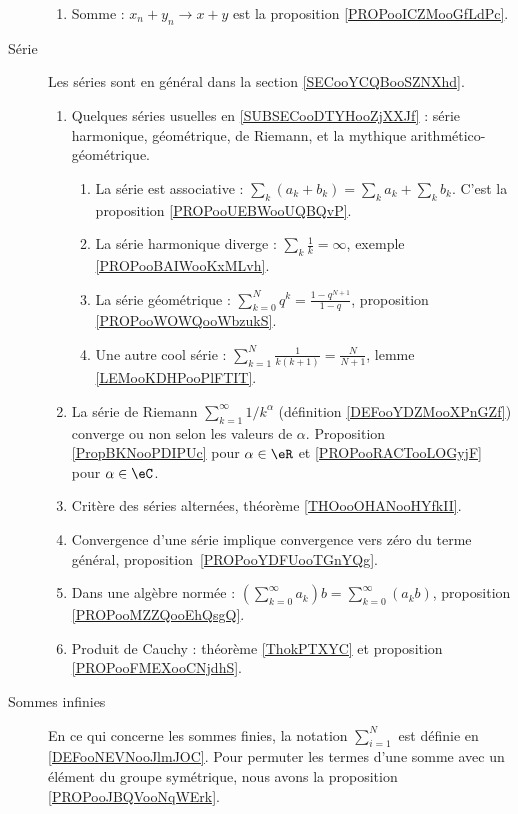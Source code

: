 \begin{description}
\begin{enumerate}
			\item
			      Somme : \( x_n+y_n\to x+y\) est la proposition \ref{PROPooICZMooGfLdPc}.
		\end{enumerate}
	\item[Série]
		Les séries sont en général dans la section \ref{SECooYCQBooSZNXhd}.
		\begin{enumerate}
			\item
			      Quelques séries usuelles en \ref{SUBSECooDTYHooZjXXJf} : série harmonique, géométrique, de Riemann, et la mythique arithmético-géométrique.
			      \begin{enumerate}
				      \item
				            La série est associative : \( \sum_k(a_k+b_k)=\sum_ka_k+\sum_kb_k\). C'est la proposition \ref{PROPooUEBWooUQBQvP}.
				      \item
				            La série harmonique diverge : \( \sum_k\frac{1}{ k }=\infty\), exemple \ref{PROPooBAIWooKxMLvh}.
				      \item
				            La série géométrique : \( \sum_{k=0}^Nq^k=\frac{ 1-q^{N+1} }{ 1-q }\), proposition \ref{PROPooWOWQooWbzukS}.
				      \item
				            Une autre cool série : \( \sum_{k=1}^N\frac{ 1 }{ k(k+1) }=\frac{ N }{ N+1 }\), lemme \ref{LEMooKDHPooPlFTIT}.
			      \end{enumerate}
			\item
			      La série de Riemann \( \sum_{k=1}^{\infty}1/k^{\alpha}\) (définition \ref{DEFooYDZMooXPnGZf}) converge ou non selon les valeurs de \( \alpha\). Proposition \ref{PropBKNooPDIPUc} pour \( \alpha\in \eR\) et \ref{PROPooRACTooLOGyjF} pour \( \alpha\in \eC\).
			\item
			      Critère des séries alternées, théorème \ref{THOooOHANooHYfkII}.
			\item
			      Convergence d'une série implique convergence vers zéro du terme général, proposition~\ref{PROPooYDFUooTGnYQg}.
			\item
			      Dans une algèbre normée : \( (\sum_{k=0}^{\infty}a_k)b=\sum_{k=0}^{\infty}(a_kb)\), proposition \ref{PROPooMZZQooEhQsgQ}.
			\item
			      Produit de Cauchy : théorème \ref{ThokPTXYC} et proposition \ref{PROPooFMEXooCNjdhS}.
		\end{enumerate}

	\item[Sommes infinies]
		En ce qui concerne les sommes finies, la notation \( \sum_{i=1}^N\) est définie en \ref{DEFooNEVNooJlmJOC}. Pour permuter les termes d'une somme avec un élément du groupe symétrique, nous avons la proposition \ref{PROPooJBQVooNqWErk}.


\end{description}
